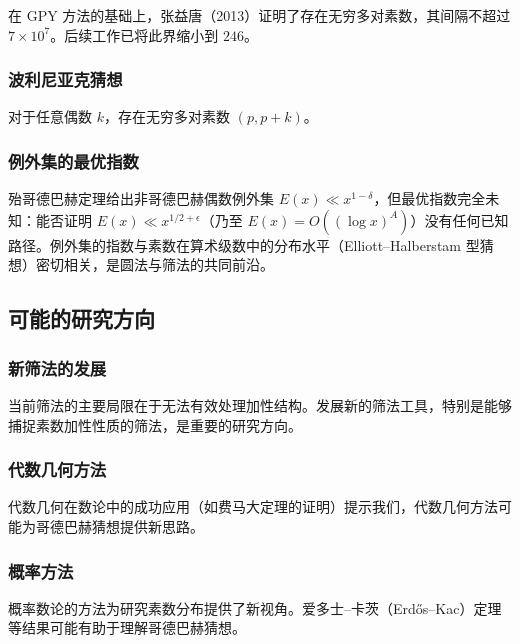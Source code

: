 在 GPY 方法\cite{goldston2009small}的基础上，张益唐（2013）证明了存在无穷多对素数，其间隔不超过 $7 \times 10^7$\cite{zhang2014bounded}。后续工作已将此界缩小到 $246$\cite{maynard2015small}。

\subsubsection{波利尼亚克猜想}

\begin{conjecture}[波利尼亚克猜想]
    对于任意偶数 $k$，存在无穷多对素数 $(p, p+k)$。
\end{conjecture}

\subsubsection{例外集的最优指数}

殆哥德巴赫定理给出非哥德巴赫偶数例外集 $E(x) \ll x^{1-\delta}$，但最优指数完全未知：能否证明 $E(x) \ll x^{1/2+\epsilon}$（乃至 $E(x) = O((\log x)^A)$）没有任何已知路径。例外集的指数与素数在算术级数中的分布水平（Elliott--Halberstam 型猜想）密切相关，是圆法与筛法的共同前沿。

\subsection{可能的研究方向}

\subsubsection{新筛法的发展}

当前筛法的主要局限在于无法有效处理加性结构\cite{halberstam1974sieve}。发展新的筛法工具，特别是能够捕捉素数加性性质的筛法，是重要的研究方向。

\subsubsection{代数几何方法}

代数几何在数论中的成功应用（如费马大定理的证明）提示我们，代数几何方法可能为哥德巴赫猜想提供新思路。

\subsubsection{概率方法}

概率数论的方法为研究素数分布提供了新视角。爱多士--卡茨（Erd\H{o}s--Kac）定理等结果可能有助于理解哥德巴赫猜想。


